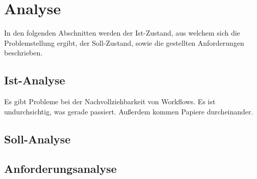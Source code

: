 \chapter{Analyse} \label{chap:analyse}

In den folgenden Abschnitten werden der Ist-Zustand, aus welchem sich die Problemstellung ergibt,
der Soll-Zustand, sowie die gestellten Anforderungen beschrieben.

\section{Ist-Analyse} \label{sec:ist-analyse}

Es gibt Probleme bei der Nachvollziehbarkeit von Workflows. Es ist undurchsichtig, was gerade
passiert. Außerdem kommen Papiere durcheinander.

\section{Soll-Analyse} \label{sec:soll-analyse}

\section{Anforderungsanalyse} \label{sec:anforderungsanalyse}

